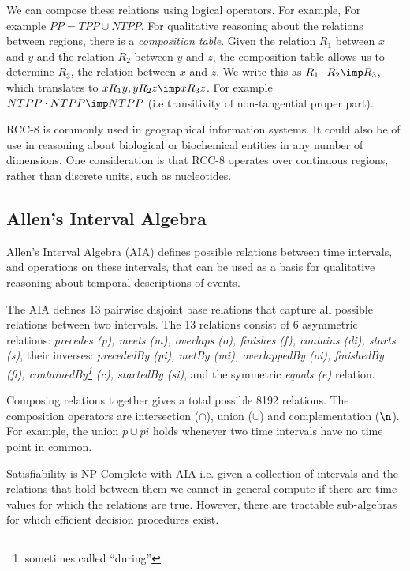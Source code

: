 \documentclass{article}
\begin{document}
We can compose these relations using logical operators. For example,
For example $PP = TPP \cup NTPP$.  For qualitative reasoning about the
relations between regions, there is a \emph{composition
  table}\cite{Cohn1997}. Given the relation $R_1$ between $x$ and $y$
and the relation $R_2$ between $y$ and $z$, the composition table
allows us to determine $R_3$, the relation between $x$ and $z$. We
write this as $R_1 \cdot R_2 \imp R_3$, which translates to $xR_1y,
yR_2z \imp xR_3z$. For example $NTPP \cdot NTPP \imp NTPP$ (i.e
transitivity of non-tangential proper part).

RCC-8 is commonly used in geographical information systems. It could
also be of use in reasoning about biological or biochemical entities
in any number of dimensions. One consideration is that RCC-8 operates
over continuous regions, rather than discrete units, such as
nucleotides.

\subsection{Allen's Interval Algebra}

Allen's Interval Algebra (AIA)\cite{allen_maintaining_1983} defines
possible relations between time intervals, and operations on these
intervals, that can be used as a basis for qualitative reasoning about
temporal descriptions of events.

The AIA defines 13 pairwise disjoint base relations that capture all
possible relations between two intervals. The 13 relations consist of
6 asymmetric relations: \emph{precedes (p), meets (m), overlaps (o),
  finishes (f), contains (di), starts (s)}, their inverses:
\emph{precededBy (pi), metBy (mi), overlappedBy (oi), finishedBy (fi),
  containedBy\footnote{sometimes called ``during''} (c), startedBy
  (si)}, and the symmetric \emph{equals (e)} relation.

Composing relations together gives a total possible 8192
relations. The composition operators are intersection ($\cap$), union
($\cup$) and complementation ($\n$). For example, the union $p \cup
pi$ holds whenever two time intervals have no time point in common.

Satisfiability is NP-Complete with AIA i.e. given a collection of
intervals and the relations that hold between them we cannot in
general compute if there are time values for which the relations are
true. However, there are tractable sub-algebras for which efficient
decision procedures exist\cite{Krokhin03reasoningabout}.
\end{document}
